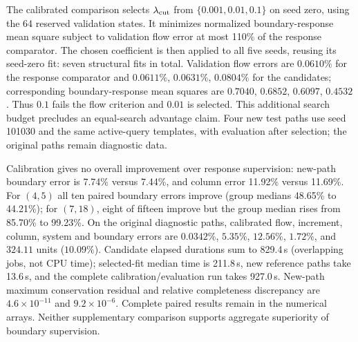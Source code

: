 The calibrated comparison selects $\lambda_{\rm cut}$ from
$\{0.001,0.01,0.1\}$ on seed zero, using the 64 reserved validation
states. It minimizes normalized boundary-response mean square subject
to validation flow error at most 110\% of the response comparator.
The chosen coefficient is then applied to all five seeds, reusing its
seed-zero fit: seven structural fits in total. Validation flow errors
are $0.0610\%$ for the response comparator and $0.0611\%$, $0.0631\%$,
$0.0804\%$ for the candidates; corresponding boundary-response mean
squares are $0.7040$, $0.6852$, $0.6097$, $0.4532$. Thus $0.1$ fails
the flow criterion and $0.01$ is selected. This additional search budget
precludes an equal-search advantage claim. Four new test paths use seed
101030 and the same active-query templates, with evaluation after
selection; the original paths remain diagnostic data.

Calibration gives no overall improvement over response supervision:
new-path boundary error is 7.74\% versus 7.44\%, and column error
11.92\% versus 11.69\%. For $(4,5)$ all ten paired boundary errors
improve (group medians 48.65\% to 44.21\%); for $(7,18)$, eight of
fifteen improve but the group median rises from 85.70\% to 99.23\%.
On the original diagnostic paths, calibrated flow, increment, column,
system and boundary errors are $0.0342\%$, $5.35\%$, $12.56\%$,
$1.72\%$, and $324.11$ units ($10.09\%$). Candidate elapsed durations
sum to 829.4\,s (overlapping jobs, not CPU time); selected-fit median
time is 211.8\,s, new reference paths take 13.6\,s, and the complete
calibration/evaluation run takes 927.0\,s. New-path maximum conservation
residual and relative completeness discrepancy are $4.6\times10^{-11}$
and $9.2\times10^{-6}$. Complete paired results remain in the numerical
arrays. Neither supplementary comparison supports aggregate superiority
of boundary supervision.

